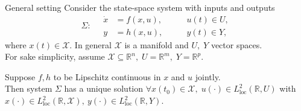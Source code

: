 \documentclass[aspectratio=169]{beamer}
\newcommand{\bbR}{\mathbb{R}}
\begin{document}
\begin{frame}{General setting}
Consider the state-space system  with inputs and outputs
\begin{equation*}
	\Sigma : \quad 
	\begin{aligned}
		\dot{x} &= f(x, u), \\
		y &= h(x,u),
	\end{aligned} \qquad
	\begin{aligned}
		u(t) \in U, \\
		y(t) \in Y,
	\end{aligned}
\end{equation*} 
where $x(t) \in \mathcal{X}$. In general $\mathcal{X}$ is a manifold and $U,\; Y$ vector spaces. \\

For sake simplicity, assume $\mathcal{X} \subseteq \bbR^n,\; U=\bbR^m, \; Y=\bbR^p$.

\begin{theorem}
	Suppose $f, h$ to be Lipschitz continuous in $x$ and $u$ jointly. \\
	Then system $\Sigma$ has a unique solution $\forall x(t_0) \in \mathcal{X}, \; u(\cdot) \in L^2_{\text{loc}}(\bbR, U)$ with $x(\cdot) \in L^2_{\text{loc}}(\bbR, \mathcal{X}), \ y(\cdot) \in L^2_{\text{loc}}(\bbR, Y)$.
\end{theorem}

\end{frame}
\end{document}
